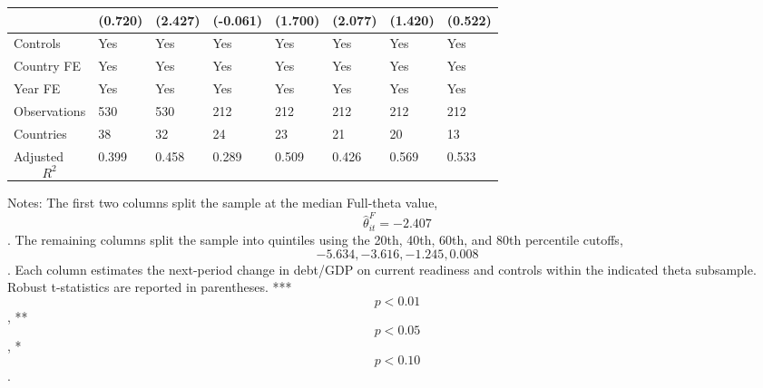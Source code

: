 \begin{table}[H]
\begin{threeparttable}
\begin{tabularx}{\textwidth}{lYYYYYYY}
  & (0.720) & (2.427) & (-0.061) & (1.700) & (2.077) & (1.420) & (0.522) \\
\midrule
Controls & Yes & Yes & Yes & Yes & Yes & Yes & Yes \\
Country FE & Yes & Yes & Yes & Yes & Yes & Yes & Yes \\
Year FE & Yes & Yes & Yes & Yes & Yes & Yes & Yes \\
Observations & 530 & 530 & 212 & 212 & 212 & 212 & 212 \\
Countries & 38 & 32 & 24 & 23 & 21 & 20 & 13 \\
Adjusted $$R^2$$ & 0.399 & 0.458 & 0.289 & 0.509 & 0.426 & 0.569 & 0.533 \\
\bottomrule
\end{tabularx}
\begin{tablenotes}[flushleft]\footnotesize
\item Notes: The first two columns split the sample at the median Full-theta value, $$\widehat{\theta}^{F}_{it}=-2.407$$. The remaining columns split the sample into quintiles using the 20th, 40th, 60th, and 80th percentile cutoffs, $$-5.634, -3.616, -1.245, 0.008$$. Each column estimates the next-period change in debt/GDP on current readiness and controls within the indicated theta subsample. Robust t-statistics are reported in parentheses. *** $$p<0.01$$, ** $$p<0.05$$, * $$p<0.10$$.
\end{tablenotes}
\end{threeparttable}
\end{table}
